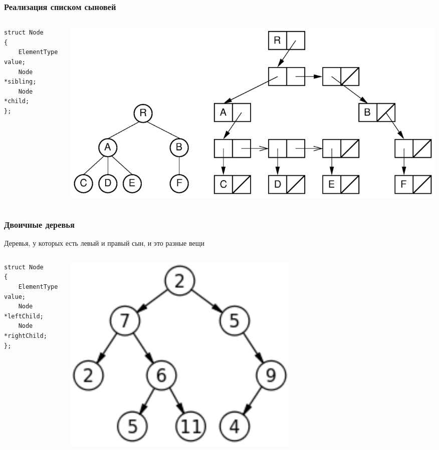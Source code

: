 \documentclass[xetex,mathserif,serif]{beamer}
\begin{document}
	\begin{frame}[fragile]
		\frametitle{Реализация списком сыновей}
		\begin{columns}
			\begin{column}{0.4\textwidth}
				\begin{verbatim}
struct Node
{
    ElementType value;
    Node *sibling;
    Node *child;
};
				\end{verbatim}
			\end{column}
			\begin{column}{0.6\textwidth}
				\begin{center}
					\includegraphics[width=\textwidth]{childListTree.png}
				\end{center}
			\end{column}
		\end{columns}
	\end{frame}

	\begin{frame}[fragile]
		\frametitle{Двоичные деревья}
		Деревья, у которых есть левый и правый сын, и это разные вещи
		\begin{columns}
			\begin{column}{0.5\textwidth}
				\begin{verbatim}
struct Node
{
    ElementType value;
    Node *leftChild;
    Node *rightChild;
};
				\end{verbatim}
			\end{column}
			\begin{column}{0.5\textwidth}
				\begin{center}
					\includegraphics[width=0.6\textwidth]{binaryTree.png}
				\end{center}
			\end{column}
		\end{columns}
	\end{frame}
\end{document}
